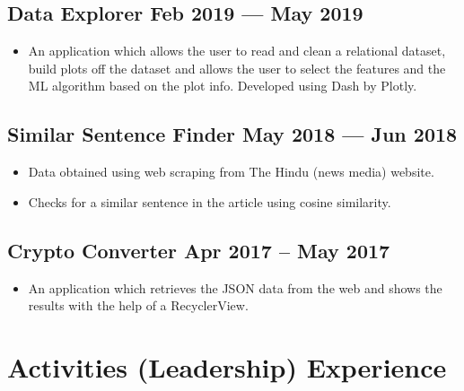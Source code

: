 \documentclass[a4,10pt]{article}
\newenvironment{zitemize}{
\begin{itemize}\itemsep0pt \parskip0pt \parsep1pt}
{\end{itemize}\vspace{-0.5cm}}
\begin{document}
\subsection*{Data Explorer \hfill Feb 2019 --- May 2019} 
    \begin{zitemize}
        \item An application which allows the user to read and clean a relational dataset, build plots off the dataset and allows the user to select the features and the ML algorithm based on the plot info. Developed using Dash by Plotly.
    \end{zitemize}


\subsection*{Similar Sentence Finder \hfill May 2018 --- Jun 2018} 
    \begin{zitemize}
        \item Data obtained using web scraping from The Hindu (news media) website. 
        \item Checks for a similar sentence in the article using cosine similarity.
    \end{zitemize}


\subsection*{Crypto Converter \hfill Apr 2017 – May 2017} 
    \begin{zitemize}
        \item An application which retrieves the JSON data from the web and shows the results with the help of a RecyclerView.
    \end{zitemize}



\section{Activities (Leadership) Experience}
\end{document}
